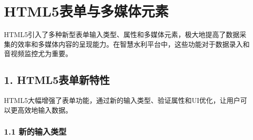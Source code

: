 \section{HTML5表单与多媒体元素}\label{html5ux8868ux5355ux4e0eux591aux5a92ux4f53ux5143ux7d20}

HTML5引入了多种新型表单输入类型、属性和多媒体元素，极大地提高了数据采集的效率和多媒体内容的呈现能力。在智慧水利平台中，这些功能对于数据录入和音视频监控尤为重要。

\subsection{1.
HTML5表单新特性}\label{html5ux8868ux5355ux65b0ux7279ux6027}

HTML5大幅增强了表单功能，通过新的输入类型、验证属性和UI优化，让用户可以更高效地输入数据。

\subsubsection{1.1
新的输入类型}\label{ux65b0ux7684ux8f93ux5165ux7c7bux578b}

